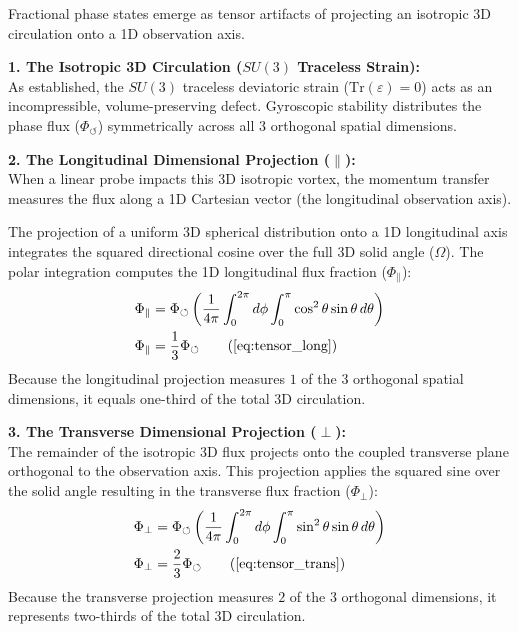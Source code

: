Fractional phase states emerge as tensor artifacts of projecting an isotropic 3D circulation onto a 1D observation axis. 

\vspace{0.2 cm}

\textbf{1. The Isotropic 3D Circulation ($SU(3)$ Traceless Strain):} \\
As established, the $SU(3)$ traceless deviatoric strain ($\text{Tr}(\varepsilon) = 0$) acts as an incompressible, volume-preserving defect. Gyroscopic stability distributes the phase flux ($\Phi_{\circlearrowleft}$) symmetrically across all $3$ orthogonal spatial dimensions. 

\vspace{0.2 cm}

\textbf{2. The Longitudinal Dimensional Projection ($\parallel$):} \\
When a linear probe impacts this 3D isotropic vortex, the momentum transfer measures the flux along a 1D Cartesian vector (the longitudinal observation axis). 

The projection of a uniform 3D spherical distribution onto a 1D longitudinal axis integrates the squared directional cosine over the full 3D solid angle ($\Omega$). The polar integration computes the 1D longitudinal flux fraction ($\Phi_{\parallel}$): 
\begin{align}
    \Phi_{\parallel} &= \Phi_{\circlearrowleft} \left( \frac{1}{4\pi} \int_{0}^{2\pi} d\phi \int_{0}^{\pi} \cos^2 \theta \sin \theta \, d\theta \right) \nonumber \\
    \Phi_{\parallel} &= \frac{1}{3} \Phi_{\circlearrowleft} \tag{\ref{eq:tensor_long}}
\end{align}
Because the longitudinal projection measures $1$ of the $3$ orthogonal spatial dimensions, it equals one-third of the total 3D circulation. 

\textbf{3. The Transverse Dimensional Projection ($\perp$):} \\
The remainder of the isotropic 3D flux projects onto the coupled transverse plane orthogonal to the observation axis. This projection applies the squared sine over the solid angle resulting in the transverse flux fraction ($\Phi_{\perp}$): 
\begin{align}
    \Phi_{\perp} &= \Phi_{\circlearrowleft} \left( \frac{1}{4\pi} \int_{0}^{2\pi} d\phi \int_{0}^{\pi} \sin^2 \theta \sin \theta \, d\theta \right) \nonumber \\
    \Phi_{\perp} &= \frac{2}{3} \Phi_{\circlearrowleft} \tag{\ref{eq:tensor_trans}}
\end{align}
Because the transverse projection measures $2$ of the $3$ orthogonal dimensions, it represents two-thirds of the total 3D circulation. 

